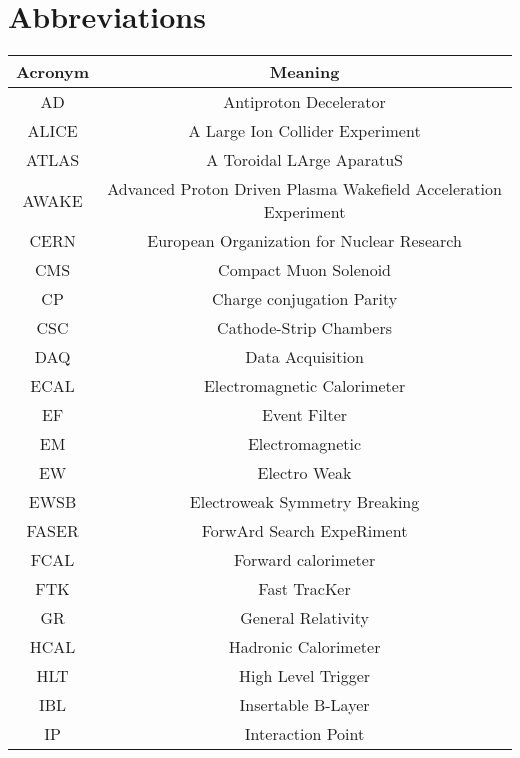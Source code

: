 
\chapter*{Abbreviations}

\def\arraystretch{1.5}
\begin{tabular}{|c|c|}
\hline \toprule
Acronym & Meaning \\ \midrule
\hline
AD          & Antiproton Decelerator                                              \\
ALICE       & A  Large Ion Collider Experiment                                    \\
ATLAS       & A Toroidal LArge AparatuS                                           \\
AWAKE       & \small Advanced Proton Driven Plasma Wakefield Acceleration Experiment \\
CERN        & European Organization for Nuclear Research                          \\
CMS         & Compact Muon Solenoid                                               \\
CP          & Charge conjugation Parity                                           \\
CSC         & Cathode-Strip Chambers                                              \\
DAQ         & Data Acquisition                                                    \\
ECAL        & Electromagnetic Calorimeter                                         \\
EF          & Event Filter                                                        \\
EM          & Electromagnetic                                                     \\
EW          & Electro Weak                                                        \\
EWSB        & Electroweak Symmetry Breaking                                       \\
FASER       & ForwArd Search ExpeRiment                                           \\
FCAL        & Forward calorimeter                                                 \\
FTK         & Fast TracKer                                                        \\
GR          & General Relativity                                                  \\
HCAL        & Hadronic Calorimeter                                                \\
HLT         & High Level Trigger                                                  \\
IBL         & Insertable B-Layer                                                  \\
IP          & Interaction Point                                                   \\


\end{tabular}
